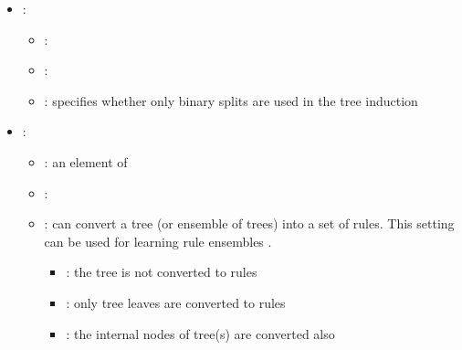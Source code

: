\begin{itemize}
\begin{itemize}
           \end{itemize}
    \item {}:
           \begin{itemize}
                \item \optionPossibleValues{}: 
                \item \optionDefaultValue{}: 
                \item \optionDescrption{}: specifies whether only binary splits are used in the tree induction
           \end{itemize}
    \item {}:
           \begin{itemize}
                \item \optionPossibleValues{}: an element of 
                \item \optionDefaultValue{}: 
                \item \optionDescrption{}:  \clus{} can convert a tree (or ensemble of trees) into a set of rules. This setting can be used for learning rule ensembles \cite{Aho2009}.
                \begin{itemize}
                	\item {}: the tree is not converted to rules
                    \item {}: only tree leaves are converted to rules
                    \item {}: the internal nodes of tree(s) are converted also
                \end{itemize}
           \end{itemize}
\end{itemize}
